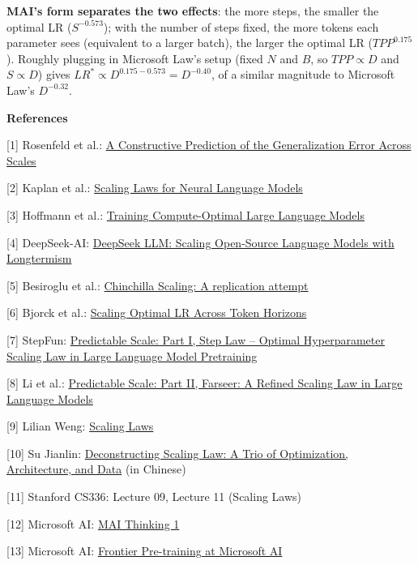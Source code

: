 \documentclass[
  english,
  11pt,
  a4paper,
]{article}
\begin{document}
\textbf{MAI's form separates the two effects}: the more steps, the
smaller the optimal LR (\(S^{-0.573}\)); with the number of steps fixed,
the more tokens each parameter sees (equivalent to a larger batch), the
larger the optimal LR (\(TPP^{0.175}\)). Roughly plugging in Microsoft
Law's setup (fixed \(N\) and \(B\), so \(TPP\propto D\) and
\(S\propto D\)) gives \(LR^*\propto D^{0.175-0.573}=D^{-0.40}\), of a
similar magnitude to Microsoft Law's \(D^{-0.32}\).

\textbf{References}

{[}1{]} Rosenfeld et al.: \href{https://arxiv.org/abs/1909.12673}{A
Constructive Prediction of the Generalization Error Across Scales}

{[}2{]} Kaplan et al.: \href{https://arxiv.org/abs/2001.08361}{Scaling
Laws for Neural Language Models}

{[}3{]} Hoffmann et al.:
\href{https://arxiv.org/abs/2203.15556}{Training Compute-Optimal Large
Language Models}

{[}4{]} DeepSeek-AI: \href{https://arxiv.org/abs/2401.02954}{DeepSeek
LLM: Scaling Open-Source Language Models with Longtermism}

{[}5{]} Besiroglu et al.:
\href{https://arxiv.org/abs/2404.10102}{Chinchilla Scaling: A
replication attempt}

{[}6{]} Bjorck et al.: \href{https://arxiv.org/abs/2409.19913}{Scaling
Optimal LR Across Token Horizons}

{[}7{]} StepFun: \href{https://arxiv.org/abs/2503.04715}{Predictable
Scale: Part I, Step Law -- Optimal Hyperparameter Scaling Law in Large
Language Model Pretraining}

{[}8{]} Li et al.: \href{https://arxiv.org/abs/2506.10972}{Predictable
Scale: Part II, Farseer: A Refined Scaling Law in Large Language Models}

{[}9{]} Lilian Weng:
\href{https://lilianweng.github.io/posts/2026-06-24-scaling-laws/}{Scaling
Laws}

{[}10{]} Su Jianlin:
\href{https://kexue.fm/archives/11833}{Deconstructing Scaling Law: A
Trio of Optimization, Architecture, and Data} (in Chinese)

{[}11{]} Stanford CS336: Lecture 09, Lecture 11 (Scaling Laws)

{[}12{]} Microsoft AI:
\href{https://microsoft.ai/pdf/mai-thinking-1.pdf}{MAI Thinking 1}

{[}13{]} Microsoft AI:
\href{https://microsoft.ai/news/frontier-pre-training-at-microsoft-ai/}{Frontier
Pre-training at Microsoft AI}
\end{document}
